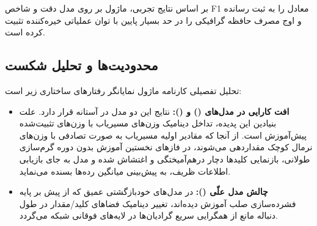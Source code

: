 بر اساس نتایج تجربی، ماژول  بر روی مدل  دقت  و شاخص F1 معادل  را به ثبت رسانده و اوج مصرف حافظه گرافیکی را در حد بسیار پایین  با توان عملیاتی خیره‌کننده  تثبیت کرده است.

\subsection{محدودیت‌ها و تحلیل شکست}
تحلیل تفصیلی کارنامه ماژول نمایانگر رفتارهای ساختاری زیر است:
\begin{itemize}
    \item \textbf{افت کارایی در مدل‌های  () و  ():} نتایج این دو مدل در آستانه  قرار دارد. علت بنیادین این پدیده، تداخل دینامیک وزن‌های مسیریاب با وزن‌های تثبیت‌شده پیش‌آموزش است. از آنجا که مقادیر اولیه مسیریاب به صورت تصادفی با وزن‌های نرمال کوچک مقداردهی می‌شوند، در فازهای نخستین آموزش بدون دوره گرم‌سازی طولانی، بازنمایی کلیدها دچار درهم‌آمیختگی و اغتشاش شده و مدل به جای بازیابی اطلاعات ظریف، به پیش‌بینی میانگین رده‌ها بسنده می‌نماید.
    \item \textbf{چالش مدل علّی  ():} در مدل‌های خودبازگشتی عمیق که از پیش بر پایه فشرده‌سازی صلب  آموزش دیده‌اند، تغییر دینامیک فضاهای کلید/مقدار در طول دنباله مانع از همگرایی سریع گرادیان‌ها در لایه‌های فوقانی شبکه می‌گردد.
\end{itemize}
